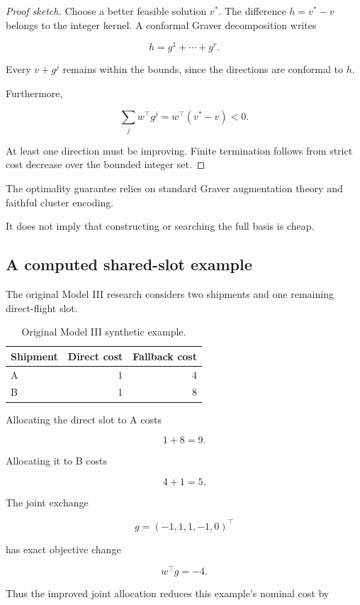 \documentclass[10pt,a4paper]{article}
\theoremstyle{plain}
\theoremstyle{definition}
\theoremstyle{remark}
\begin{document}
\begin{proof}[Proof sketch]
Choose a better feasible solution \(v^*\).
The difference \(h=v^*-v\)
belongs to the integer kernel.
A conformal Graver decomposition
writes

\[
h=g^1+\cdots+g^r.
\]

Every \(v+g^j\) remains
within the bounds, since the
directions are conformal to \(h\).

Furthermore,

\[
\sum_jw^\top g^j
=
w^\top(v^*-v)<0.
\]

At least one direction must be improving.
Finite termination follows from strict
cost decrease over the bounded integer set.
\end{proof}

The optimality guarantee relies on
standard Graver augmentation theory
and faithful cluster encoding.

It does not imply that constructing
or searching the full basis is cheap.

\subsection{A computed shared-slot example}

The original Model III research considers
two shipments and one remaining direct-flight slot.

\begin{table}[!htbp]
\centering
\caption{Original Model III synthetic example.}
\small
\begin{tabular}{@{}lrr@{}}
\toprule
Shipment & Direct cost & Fallback cost \\
\midrule
A & 1 & 4 \\
B & 1 & 8 \\
\bottomrule
\end{tabular}
\end{table}

Allocating the direct slot to A costs

\[
1+8=9.
\]

Allocating it to B costs

\[
4+1=5.
\]

The joint exchange

\[
g=(-1,1,1,-1,0)^\top
\]

has exact objective change

\[
w^\top g=-4.
\]

Thus the improved joint allocation reduces
this example's nominal cost by
\end{document}
